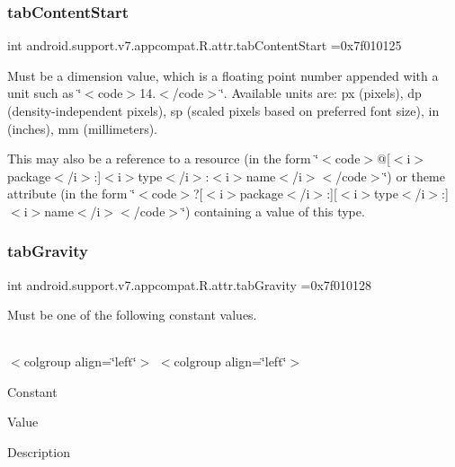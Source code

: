 \subsubsection{\texorpdfstring{tab\+Content\+Start}{tabContentStart}}
{\footnotesize\ttfamily int android.\+support.\+v7.\+appcompat.\+R.\+attr.\+tab\+Content\+Start =0x7f010125\hspace{0.3cm}{\ttfamily [static]}}

Must be a dimension value, which is a floating point number appended with a unit such as \char`\"{}$<$code$>$14.\+5sp$<$/code$>$\char`\"{}. Available units are\+: px (pixels), dp (density-\/independent pixels), sp (scaled pixels based on preferred font size), in (inches), mm (millimeters). 

This may also be a reference to a resource (in the form \char`\"{}$<$code$>$@\mbox{[}$<$i$>$package$<$/i$>$\+:\mbox{]}$<$i$>$type$<$/i$>$\+:$<$i$>$name$<$/i$>$$<$/code$>$\char`\"{}) or theme attribute (in the form \char`\"{}$<$code$>$?\mbox{[}$<$i$>$package$<$/i$>$\+:\mbox{]}\mbox{[}$<$i$>$type$<$/i$>$\+:\mbox{]}$<$i$>$name$<$/i$>$$<$/code$>$\char`\"{}) containing a value of this type. \mbox{\label{classandroid_1_1support_1_1v7_1_1appcompat_1_1R_1_1attr_a5d6760873df12ac6f6ed6f1972613390}} 
\subsubsection{\texorpdfstring{tab\+Gravity}{tabGravity}}
{\footnotesize\ttfamily int android.\+support.\+v7.\+appcompat.\+R.\+attr.\+tab\+Gravity =0x7f010128\hspace{0.3cm}{\ttfamily [static]}}

Must be one of the following constant values.

\tabulinesep=1mm
\begin{longtabu} spread 0pt [c]{*{0}{|X[-1]}|}
\hline
\end{longtabu}
$<$colgroup align=\char`\"{}left\char`\"{}$>$ $<$colgroup align=\char`\"{}left\char`\"{}$>$ 

Constant

Value

Description 

